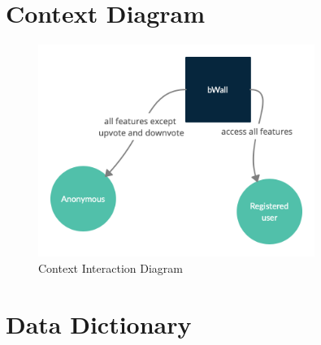 \documentclass[12pt]{report}
\begin{document}
\section{Context Diagram}
\begin{figure}[H]
\centering
\includegraphics[width=9cm]{dfd0-2.png}
\caption{Context Interaction Diagram}
\label{fig:context}
\end{figure}

\section{Data Dictionary}
\end{document}
